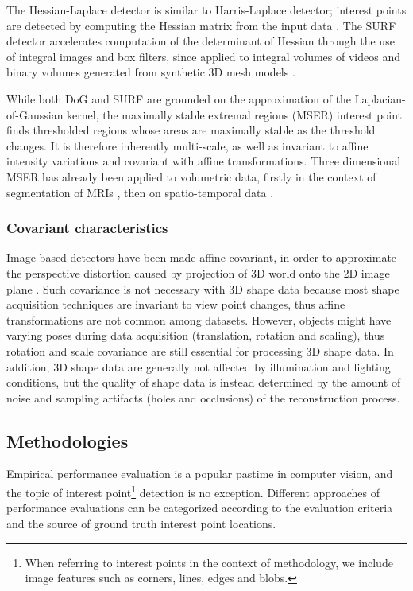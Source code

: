 The Hessian-Laplace detector is similar to Harris-Laplace detector; interest points are detected by computing the Hessian matrix from the input data \cite{Mikolajczyk2004}. The SURF detector \cite{Bay2008} accelerates computation of the determinant of Hessian through the use of integral images and box filters, since applied to integral volumes of videos \cite{Willems2008} and binary volumes generated from synthetic 3D mesh models \cite{Knopp2010}.

While both DoG and SURF are grounded on the approximation of the Laplacian-of-Gaussian kernel,  the maximally stable extremal regions (MSER) interest point \cite{Matas2004} finds thresholded regions whose areas are maximally stable as the threshold changes. It is therefore inherently multi-scale, as well as invariant to affine intensity variations and covariant with affine transformations. Three dimensional MSER has already been applied to volumetric data, firstly in the context of segmentation of MRIs \cite{Donoser2006}, then on spatio-temporal data \cite{Riemenschneider2009}.

\subsubsection{Covariant characteristics}

Image-based detectors have been made affine-covariant, in order to approximate the perspective distortion caused by projection of 3D world onto the 2D image plane \cite{Mikolajczyk2002}. Such covariance is not necessary with 3D shape data because most shape acquisition techniques are invariant to view point changes, thus affine transformations are not common among datasets. However, objects might have varying poses during data acquisition (\ie translation, rotation and scaling), thus rotation and scale covariance are still essential for processing 3D shape data. In addition, 3D shape data are generally not affected by illumination and lighting conditions, but the quality of shape data is instead determined by the amount of noise and sampling artifacts (\eg holes and occlusions) of the reconstruction process. 

\subsection{Methodologies}
Empirical performance evaluation is a popular pastime in computer vision, and the topic of interest point\footnote{When referring to interest points in the context of methodology, we include image features such as corners, lines, edges and blobs.} detection is no exception. Different approaches of performance evaluations can be categorized according to the evaluation criteria and the source of ground truth interest point locations. 

